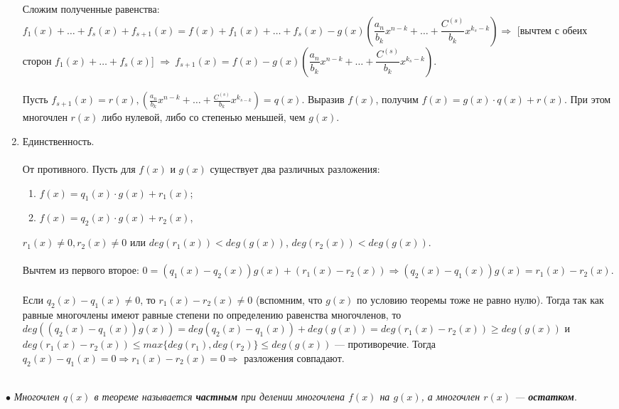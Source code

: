 \begin{Proof}
\begin{enumerate}
		Сложим полученные равенства: $f_1(x) + \ldots + f_s(x) + f_{s+1}(x) = f(x) + f_1(x) + \ldots + f_s(x) - g(x)( \dfrac{a_n}{b_k}x^{n-k} + \ldots + 
		\dfrac{C^{(s)}}{b_k}x^{k_s-k}) \Rightarrow$ [вычтем с обеих сторон $f_1(x) + \ldots + f_s(x)$]  $\Rightarrow\ f_{s+1}(x) = f(x) - g(x)( \dfrac{a_n}{b_k}x^{n-k} + \ldots + \dfrac{C^{(s)}}{b_k}x^{k_s-k})$.\\\\
		Пусть $f_{s+1}(x) = r(x), (\frac{ a_n}{b_k}x^{n-k} + … + \frac{C^{(s)}}{b_k}x^{k_{s-k}}) = q(x)$. Выразив $f(x)$, получим $f(x) = g(x)\cdot q(x) + r(x)$. При 
		этом многочлен $r(x)$ либо нулевой, либо со степенью меньшей, чем $g(x)$.
		\item Единственность.\\\\
		От противного. Пусть для $f(x)$ и $g(x)$ существует два различных разложения:
		\begin{enumerate}
			\item $f(x) = q_1(x)\cdot g(x) + r_1(x)$;
			\item $f(x) = q_2(x)\cdot g(x) + r_2(x)$,
		\end{enumerate}
		$r_1(x) \ne 0, r_2(x)\ne0$ или $deg(r_1(x)) < deg(g(x))$, $deg(r_2(x)) < deg(g(x))$.\\\\
		Вычтем из первого второе:
		$0 = (q_1(x) - q_2(x))g(x) + (r_1(x) - r_2(x)) \Rightarrow (q_2(x) - q_1(x))g(x) = r_1(x) - r_2(x)$.\\\\
		Если $q_2(x) - q_1(x) \not= 0$, то $r_1(x) - r_2(x) \not= 0$ (вспомним, что $g(x)$ по условию теоремы тоже не равно 
		нулю). Тогда так как равные многочлены имеют равные степени по определению равенства многочленов, то 
		$deg((q_2(x) - q_1(x))g(x)) = deg(q_2(x) - q_1(x)) + deg(g(x)) = deg(r_1(x) - r_2(x)) \geqslant deg(g(x))$ и $ deg(r_1(x) - r_2(x)) \leqslant max \{deg(r_1), deg(r_2)\} \leqslant
		deg(g(x))$ --- противоречие. Тогда $q_2(x) - q_1(x) = 0\Rightarrow r_1(x) - r_2(x) = 0 \Rightarrow$ разложения совпадают. 
	\end{enumerate}
\end{Proof}\\
$\bullet$ \textit{Многочлен $q(x)$ в теореме называется \textbf{частным} при делении многочлена $f(x)$ на $g(x)$, а многочлен $r(x)$ --- \textbf{остатком}}.

